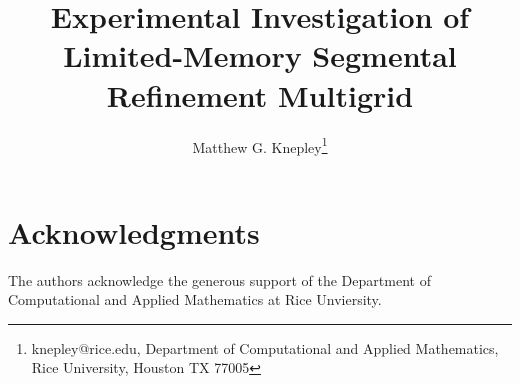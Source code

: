 \documentclass[]{siamltex}
\begin{document}
\title{Experimental Investigation of Limited-Memory Segmental Refinement Multigrid}
\author{
  Matthew G. Knepley\thanks{knepley@rice.edu, Department of Computational and Applied Mathematics, Rice University, Houston TX 77005}
}

\maketitle

\begin{abstract}

\end{abstract}



\section*{Acknowledgments}
The authors acknowledge the generous support of the Department of Computational and Applied Mathematics at Rice Unviersity.



\end{document}
